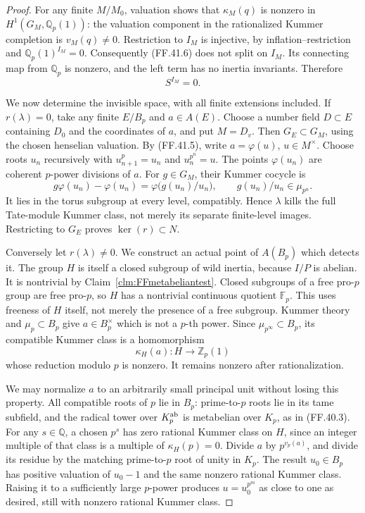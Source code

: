 \begin{proof}
For any finite \(M/M_0\), valuation
shows that \(\kappa_M(q)\) is nonzero
in \(H^1(G_M,\mathbb Q_p(1))\):
the valuation component in the
rationalized Kummer completion is
\(v_M(q)\ne0\). Restriction to
\(I_M\) is injective, by
inflation--restriction and
\(\mathbb Q_p(1)^{I_M}=0\).
Consequently (FF.41.6) does not split
on \(I_M\). Its connecting map
from \(\mathbb Q_p\) is nonzero,
and the left term has no inertia
invariants. Therefore
\[
                         S^{I_M}=0.
                                                        \tag{FF.41.7}
\]

We now determine the invisible space,
with all finite extensions included.
If \(r(\lambda)=0\), take any
finite \(E/B_p\) and \(a\in A(E)\).
Choose a number field \(D\subset E\)
containing \(D_0\) and the coordinates
of \(a\), and put \(M=D_v\).
Then \(G_E\subset G_M\), using
the chosen henselian valuation.
By (FF.41.5), write
\(a=\varphi(u)\), \(u\in M^\times\).
Choose roots \(u_n\) recursively
with \(u_{n+1}^p=u_n\) and
\(u_n^{p^n}=u\). The points
\(\varphi(u_n)\) are coherent
\(p\)-power divisions of \(a\).
For \(g\in G_M\), their Kummer
cocycle is
\[
       g\varphi(u_n)-\varphi(u_n)
           =\varphi\bigl(g(u_n)/u_n\bigr),
       \qquad g(u_n)/u_n\in\mu_{p^n}.
                                                        \tag{FF.41.8}
\]
It lies in the torus subgroup at
every level, compatibly. Hence
\(\lambda\) kills the full Tate-module
Kummer class, not merely its separate
finite-level images. Restricting to
\(G_E\) proves
\(\ker(r)\subset N\).

Conversely let \(r(\lambda)\ne0\).
We construct an actual point of
\(A(B_p)\) which detects it.
The group \(H\) is itself a closed
subgroup of wild inertia, because
\(I/P\) is abelian. It is nontrivial
by Claim~\ref{clm:FFmetabeliantest}.
Closed subgroups of a free pro-\(p\)
group are free pro-\(p\), so \(H\)
has a nontrivial continuous quotient
\(\mathbb F_p\). This uses freeness
of \(H\) itself, not merely the
presence of a free subgroup.
Kummer theory and \(\mu_p\subset B_p\)
give \(a\in B_p^\times\) which is
not a \(p\)-th power.
Since \(\mu_{p^\infty}\subset B_p\),
its compatible Kummer class is a
homomorphism
\[
       \kappa_H(a):H\longrightarrow\mathbb Z_p(1)
                                                        \tag{FF.41.9}
\]
whose reduction modulo \(p\) is
nonzero. It remains nonzero after
rationalization.

We may normalize \(a\) to an
arbitrarily small principal unit
without losing this property.
All compatible roots of \(p\)
lie in \(B_p\): prime-to-\(p\)
roots lie in its tame subfield,
and the radical tower over
\(K_p^{\rm ab}\) is metabelian
over \(K_p\), as in (FF.40.3).
For any \(s\in\mathbb Q\), a
chosen \(p^s\) has zero rational
Kummer class on \(H\), since an
integer multiple of that class
is a multiple of \(\kappa_H(p)=0\).
Divide \(a\) by \(p^{v_p(a)}\),
and divide its residue by the
matching prime-to-\(p\) root of
unity in \(K_p\). The result
\(u_0\in B_p\) has positive
valuation of \(u_0-1\) and the
same nonzero rational Kummer class.
Raising it to a sufficiently large
\(p\)-power produces
\(u=u_0^{p^m}\) as close to one
as desired, still with nonzero
rational Kummer class.


\end{proof}
